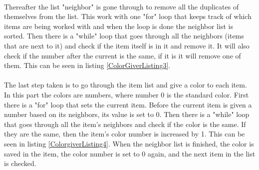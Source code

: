 \\
Thereafter the list "neighbor" is gone through to remove all the duplicates of themselves from the list. This work with one "for" loop that keeps track of which items are being worked with and when the loop is done the neighbor list is sorted. Then there is a "while" loop that goes through all the neighbors (items that are next to it) and check if the item itself is in it and remove it. It will also check if the number after the current is the same, if it is it will remove one of them. This can be seen in listing \ref{ColorGiverListing3}.\\
\\
The last step taken is to go through the item list and give a color to each item. In this part the colors are numbers, where number 0 is the standard color. First there is a "for" loop that sets the current item. Before the current item is given a number based on its neighbors, its value is set to 0. Then there is a "while" loop that goes through all the item's neighbors and check if the color is the same. If they are the same, then the item's color number is increased by 1. This can be seen in listing \ref{ColorgiverListing4}. When the neighbor list is finished, the color is saved in the item, the color number is set to 0 again, and the next item in the list is checked.
